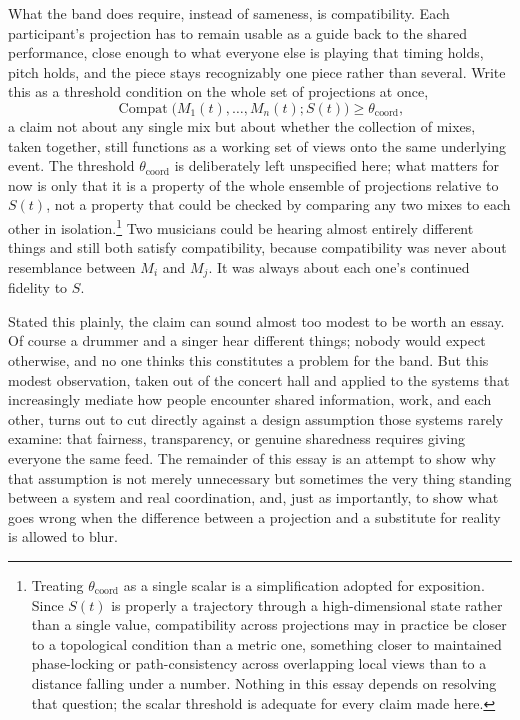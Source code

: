 \documentclass[12pt]{article}
\begin{document}
What the band does require, instead of sameness, is compatibility. Each participant's projection has to remain usable as a guide back to the shared performance, close enough to what everyone else is playing that timing holds, pitch holds, and the piece stays recognizably one piece rather than several. Write this as a threshold condition on the whole set of projections at once,
\[
\operatorname{Compat}\bigl(M_1(t), \ldots, M_n(t); S(t)\bigr) \geq \theta_{\mathrm{coord}},
\]
a claim not about any single mix but about whether the collection of mixes, taken together, still functions as a working set of views onto the same underlying event. The threshold $\theta_{\mathrm{coord}}$ is deliberately left unspecified here; what matters for now is only that it is a property of the whole ensemble of projections relative to $S(t)$, not a property that could be checked by comparing any two mixes to each other in isolation.\footnote{Treating $\theta_{\mathrm{coord}}$ as a single scalar is a simplification adopted for exposition. Since $S(t)$ is properly a trajectory through a high-dimensional state rather than a single value, compatibility across projections may in practice be closer to a topological condition than a metric one, something closer to maintained phase-locking or path-consistency across overlapping local views than to a distance falling under a number. Nothing in this essay depends on resolving that question; the scalar threshold is adequate for every claim made here.} Two musicians could be hearing almost entirely different things and still both satisfy compatibility, because compatibility was never about resemblance between $M_i$ and $M_j$. It was always about each one's continued fidelity to $S$.

Stated this plainly, the claim can sound almost too modest to be worth an essay. Of course a drummer and a singer hear different things; nobody would expect otherwise, and no one thinks this constitutes a problem for the band. But this modest observation, taken out of the concert hall and applied to the systems that increasingly mediate how people encounter shared information, work, and each other, turns out to cut directly against a design assumption those systems rarely examine: that fairness, transparency, or genuine sharedness requires giving everyone the same feed. The remainder of this essay is an attempt to show why that assumption is not merely unnecessary but sometimes the very thing standing between a system and real coordination, and, just as importantly, to show what goes wrong when the difference between a projection and a substitute for reality is allowed to blur.
\end{document}
